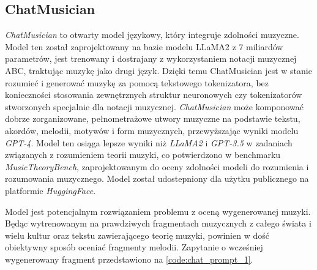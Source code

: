 \documentclass[data-science]{agh-wi} %
\begin{document}
\subsection{ChatMusician}
\textit{ChatMusician} to otwarty model językowy, który integruje zdolności muzyczne. Model ten został zaprojektowany na bazie modelu LLaMA2 z 7 miliardów parametrów, jest trenowany i dostrajany z wykorzystaniem notacji muzycznej ABC, traktując muzykę jako drugi język. Dzięki temu ChatMusician jest w stanie rozumieć i generować muzykę za pomocą tekstowego tokenizatora, bez konieczności stosowania zewnętrznych struktur neuronowych czy tokenizatorów stworzonych specjalnie dla notacji muzycznej. \textit{ChatMusician} może komponować dobrze zorganizowane, pełnometrażowe utwory muzyczne na podstawie tekstu, akordów, melodii, motywów i form muzycznych, przewyższając wyniki modelu \textit{GPT-4}. Model ten osiąga lepsze wyniki niż \textit{LLaMA2} i \textit{GPT-3.5} w zadaniach związanych z rozumieniem teorii muzyki, co potwierdzono w benchmarku \textit{MusicTheoryBench}, zaprojektowanym do oceny zdolności modeli do rozumienia i rozumowania muzycznego. Model został udostepniony dla użytku publicznego na platformie \textit{HuggingFace}.

Model jest potencjalnym rozwiązaniem problemu z oceną wygenerowanej muzyki. Będąc wytrenowanym na prawdziwych fragmentach muzycznych z całego świata i wielu kultur oraz tekstu zawierającego teorię muzyki, powinien w dość obiektywny sposób oceniać fragmenty melodii. Zapytanie o wcześniej wygenerowany fragment przedstawiono na \ref*{code:chat_prompt_1}.
\end{document}
